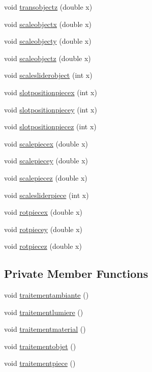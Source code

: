 \begin{DoxyCompactItemize}
void \hyperlink{class_mondock_a4577b03f35f3e2eaa7d1826b1a9f0ebe}{transobjectz} (double x)
\item 
void \hyperlink{class_mondock_a6978ac0641ff991c971ddbb571a8e8fd}{scaleobjectx} (double x)
\item 
void \hyperlink{class_mondock_a5d96ddec02aefd94fe519bcb9d973e4f}{scaleobjecty} (double x)
\item 
void \hyperlink{class_mondock_a1f5430731565a79314d90de605741e75}{scaleobjectz} (double x)
\item 
void \hyperlink{class_mondock_a0b0dfd777e3a4ee9f4ac65ab44b02fca}{scalesliderobject} (int x)
\item 
void \hyperlink{class_mondock_aab1b5fe42325904c90cb7ea01d20dda3}{slotpositionpiecex} (int x)
\item 
void \hyperlink{class_mondock_aa9b2f07da91515f13c0dc217d24357ba}{slotpositionpiecey} (int x)
\item 
void \hyperlink{class_mondock_a655881c708869d768f1488d6fa066dc6}{slotpositionpiecez} (int x)
\item 
void \hyperlink{class_mondock_a9f2a071406501e4fccde215bc38d8df9}{scalepiecex} (double x)
\item 
void \hyperlink{class_mondock_a4ac3bc0b53096e41379ac7ef64de9d2d}{scalepiecey} (double x)
\item 
void \hyperlink{class_mondock_afd3ea421e6df4deac7930ed476556aa4}{scalepiecez} (double x)
\item 
void \hyperlink{class_mondock_aa2174033ee4e3798b0c800a2c92f958f}{scalesliderpiece} (int x)
\item 
void \hyperlink{class_mondock_a124312bbc80f593e1868bf0219cf0056}{rotpiecex} (double x)
\item 
void \hyperlink{class_mondock_a2e657947e69adddb4ee8527063377a31}{rotpiecey} (double x)
\item 
void \hyperlink{class_mondock_a8f94fe729819688c88de6025642463c9}{rotpiecez} (double x)
\end{DoxyCompactItemize}
\subsection*{Private Member Functions}
\begin{DoxyCompactItemize}
\item 
void \hyperlink{class_mondock_ae228ac3c0273c3f275fb88842d9c8899}{traitementambiante} ()
\item 
void \hyperlink{class_mondock_aea9fc6ea30f9958ac3a747552ecbed17}{traitementlumiere} ()
\item 
void \hyperlink{class_mondock_ab482a04624f22351da70e316fe9c8d4e}{traitementmaterial} ()
\item 
void \hyperlink{class_mondock_aad20b3c5334d00fe5e69ac5872f76f4b}{traitementobjet} ()
\item 
void \hyperlink{class_mondock_a8f0d8c5f390853f482b38bbcf943447a}{traitementpiece} ()
\end{DoxyCompactItemize}
